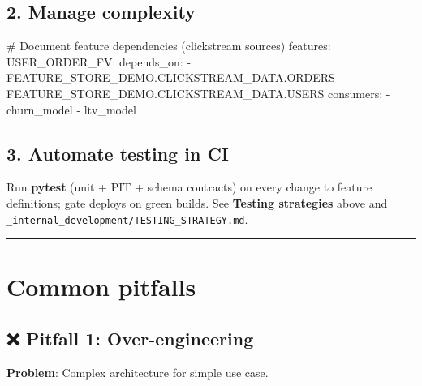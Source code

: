 \documentclass[
  letterpaper,
  DIV=11,
  numbers=noendperiod]{scrreprt}
\newenvironment{Shaded}{\begin{snugshade}}{\end{snugshade}}
\newcommand{\AttributeTok}[1]{\textcolor[rgb]{0.40,0.45,0.13}{#1}}
\newcommand{\CommentTok}[1]{\textcolor[rgb]{0.37,0.37,0.37}{#1}}
\newcommand{\FunctionTok}[1]{\textcolor[rgb]{0.28,0.35,0.67}{#1}}
\newcommand{\KeywordTok}[1]{\textcolor[rgb]{0.00,0.23,0.31}{#1}}
\begin{document}
\hypertarget{manage-complexity}{%
\subsection{2. Manage complexity}\label{manage-complexity}}

\begin{Shaded}
\begin{Highlighting}[]
\CommentTok{\# Document feature dependencies (clickstream sources)}
\FunctionTok{features}\KeywordTok{:}
\AttributeTok{  }\FunctionTok{USER\_ORDER\_FV}\KeywordTok{:}
\AttributeTok{    }\FunctionTok{depends\_on}\KeywordTok{:}
\AttributeTok{      }\KeywordTok{{-}}\AttributeTok{ FEATURE\_STORE\_DEMO.CLICKSTREAM\_DATA.ORDERS}
\AttributeTok{      }\KeywordTok{{-}}\AttributeTok{ FEATURE\_STORE\_DEMO.CLICKSTREAM\_DATA.USERS}
\AttributeTok{    }\FunctionTok{consumers}\KeywordTok{:}
\AttributeTok{      }\KeywordTok{{-}}\AttributeTok{ churn\_model}
\AttributeTok{      }\KeywordTok{{-}}\AttributeTok{ ltv\_model}
\end{Highlighting}
\end{Shaded}

\hypertarget{automate-testing-in-ci}{%
\subsection{3. Automate testing in CI}\label{automate-testing-in-ci}}

Run \textbf{pytest} (unit + PIT + schema contracts) on every change to
feature definitions; gate deploys on green builds. See \textbf{Testing
strategies} above and
\texttt{\_internal\_development/TESTING\_STRATEGY.md}.

\begin{center}\rule{0.5\linewidth}{0.5pt}\end{center}

\hypertarget{common-pitfalls-10}{%
\section{Common pitfalls}\label{common-pitfalls-10}}

\hypertarget{pitfall-1-over-engineering}{%
\subsection{❌ Pitfall 1:
Over-engineering}\label{pitfall-1-over-engineering}}

\textbf{Problem}: Complex architecture for simple use case.
\end{document}
